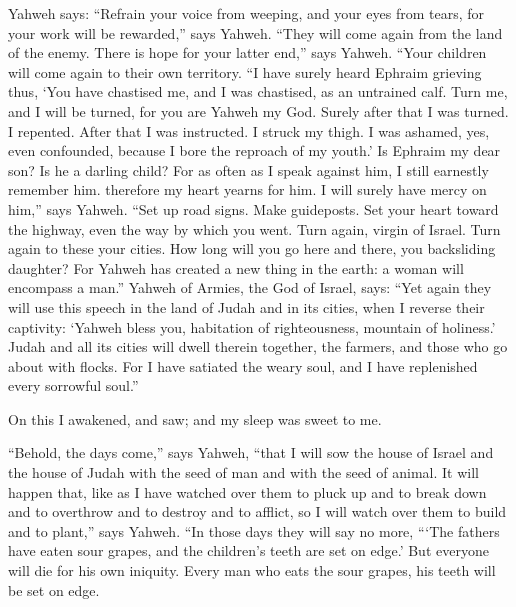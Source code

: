  Yahweh says: ``Refrain your voice from weeping, and your
eyes from tears, for your work will be rewarded,'' says Yahweh. ``They
will come again from the land of the enemy.  There is hope
for your latter end,'' says Yahweh. ``Your children will come again to
their own territory.  ``I have surely heard Ephraim
grieving thus, `You have chastised me, and I was chastised, as an
untrained calf. Turn me, and I will be turned, for you are Yahweh my
God.  Surely after that I was turned. I repented. After
that I was instructed. I struck my thigh. I was ashamed, yes, even
confounded, because I bore the reproach of my youth.'  Is
Ephraim my dear son? Is he a darling child? For as often as I speak
against him, I still earnestly remember him. therefore my heart yearns
for him. I will surely have mercy on him,'' says Yahweh. 
``Set up road signs. Make guideposts. Set your heart toward the highway,
even the way by which you went. Turn again, virgin of Israel. Turn again
to these your cities.  How long will you go here and there,
you backsliding daughter? For Yahweh has created a new thing in the
earth: a woman will encompass a man.''  Yahweh of Armies,
the God of Israel, says: ``Yet again they will use this speech in the
land of Judah and in its cities, when I reverse their captivity: `Yahweh
bless you, habitation of righteousness, mountain of holiness.'
 Judah and all its cities will dwell therein together, the
farmers, and those who go about with flocks.  For I have
satiated the weary soul, and I have replenished every sorrowful soul.''

 On this I awakened, and saw; and my sleep was sweet to me.

 ``Behold, the days come,'' says Yahweh, ``that I will sow
the house of Israel and the house of Judah with the seed of man and with
the seed of animal.  It will happen that, like as I have
watched over them to pluck up and to break down and to overthrow and to
destroy and to afflict, so I will watch over them to build and to
plant,'' says Yahweh.  ``In those days they will say no
more, ```The fathers have eaten sour grapes, and the children's teeth
are set on edge.'  But everyone will die for his own
iniquity. Every man who eats the sour grapes, his teeth will be set on
edge.

